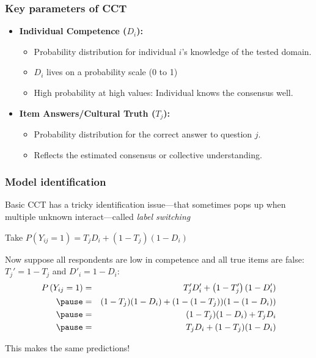 \documentclass[aspectratio=169]{beamer}
\begin{document}
\begin{frame}
    \frametitle{Key parameters of CCT}
    \begin{itemize}
        \item \textbf{Individual Competence ($D_i$):}
        \begin{itemize}
            \item Probability distribution for individual $i$'s knowledge of the tested domain.
            \item $D_i$ lives on a probability scale (0 to 1)
            \item High probability at high values: Individual knows the consensus well.
        \end{itemize}
        \item \textbf{Item Answers/Cultural Truth ($T_j$):}
        \begin{itemize}
            \item Probability distribution for the correct answer to question $j$.
            \item Reflects the estimated consensus or collective understanding.
        \end{itemize}
    \end{itemize}
\end{frame}


\begin{frame}
    \frametitle{Model identification}
    
  Basic CCT has a tricky identification issue---that sometimes pops up when multiple unknown interact---called \emph{label switching}\pause
   
   Take $P\left(Y_{ij}=1\right) = T_jD_i + \left(1-T_j\right)\left(1-D_i\right)$\pause

   Now suppose all respondents are low in competence and all true items are false: $T_j' = 1 - T_j$ and $D'_i = 1-D_i$:\pause
\begin{eqnarray*}
  P\left(Y_{ij} = 1\right) &=& T'_jD'_i + \left(1-T'_j\right)\left(1-D'_i\right)\\\pause
  &=& (1-T_j)(1-D_i) + (1-(1-T_j))(1-(1-D_i)) \\ \pause%
  &=& (1-T_j)(1-D_i) + T_j D_i \\ \pause%
  &=& T_j D_i + (1-T_j)(1-D_i) %
\end{eqnarray*}\pause

This makes the same predictions!
\end{frame}
\end{document}
